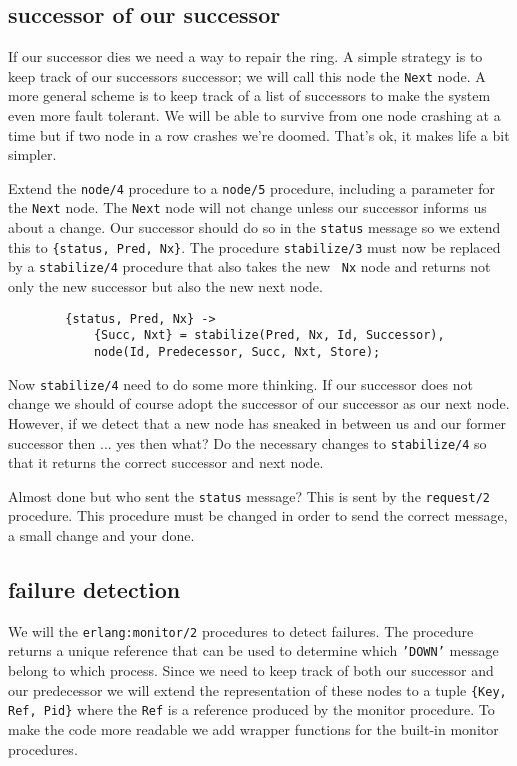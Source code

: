 \documentclass[a4paper,11pt]{article}
\begin{document}
\subsection{successor of our successor}

If our successor dies we need a way to repair the ring. A simple
strategy is to keep track of our successors successor; we will call
this node the {\tt Next} node. A more general scheme is to keep track
of a list of successors to make the system even more fault
tolerant. We will be able to survive from one node crashing at a time
but if two node in a row crashes we're doomed. That's ok, it makes
life a bit simpler.

Extend the {\tt node/4} procedure to a {\tt node/5} procedure,
including a parameter for the {\tt Next} node. The {\tt Next} node
will not change unless our successor informs us about a change. Our
successor should do so in the {\tt status} message so we extend this to
{\tt\{status, Pred, Nx\}}. The procedure {\tt stabilize/3} must now be
replaced by a {\tt stabilize/4} procedure that also takes the new {\tt
  Nx} node and returns not only the new successor but also the new
next node.

\begin{verbatim}
        {status, Pred, Nx} ->
            {Succ, Nxt} = stabilize(Pred, Nx, Id, Successor),
            node(Id, Predecessor, Succ, Nxt, Store);
\end{verbatim}

Now {\tt stabilize/4} need to do some more thinking. If our successor
does not change we should of course adopt the successor of our
successor as our next node. However, if we detect that a new node has
sneaked in between us and our former successor then ... yes then what?
Do the necessary changes to {\tt stabilize/4} so that it returns the
correct successor and next node. 

Almost done but who sent the {\tt status} message? This is sent by the
{\tt request/2} procedure. This procedure must be changed in
order to send the correct message, a small change and your done.

\subsection{failure detection}

We will the {\tt erlang:monitor/2} procedures to detect failures. The
procedure returns a unique reference that can be used to determine which
{\tt 'DOWN'} message belong to which process. Since we need to keep
track of both our successor and our predecessor we will extend the
representation of these nodes to a tuple {\tt \{Key, Ref, Pid\}} where
the {\tt Ref} is a reference produced by the monitor procedure. To
make the code more readable we add wrapper functions for the built-in
monitor procedures.
\end{document}
